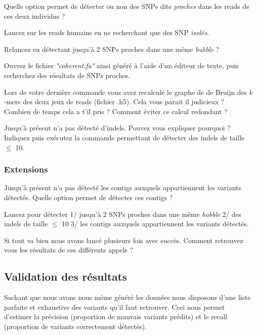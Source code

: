 \qu Quelle option permet  de détecter ou non des SNPs dits \emph{proches} dans les reads de ces deux individus ? 

\qu {} Lancez \discopp sur les reads humains en ne recherchant que des SNP \emph{isolés}.

\qu {} Relancez \discopp en détectant jusqu'à 2 SNPs proches dans une même \emph{bubble} ?

\qu Ouvrez le fichier \emph{"coherent.fa"} ainsi généré à l'aide d'un éditeur de texte, puis recherchez des résultats de SNPs proches.

\qu Lors de votre dernière commande vous avez recalculé le graphe de de Bruijn des $k$-mers des deux jeux de reads (fichier .h5). Cela vous parait il judicieux ? Combien de temps cela a t'il pris ? Comment éviter ce calcul redondant ? 


\qu {} Jusqu'à présent \discopp n'a pas détecté d'indels. Pouvez vous expliquer pourquoi ? Indiquez puis exécutez la commande permettant de détecter des indels de taille $\leq$ 10.


\subsubsection*{Extensions}
\qu Jusqu'à présent \discopp n'a pas détecté les contigs auxquels appartiennent les variants détectés. Quelle option permet de détecter ces contigs ? 

\qu Lancez \discopp pour détecter 1/ jusqu'à 2 SNPs proches dans une même \emph{bubble} 2/ des indels de taille $\leq$ 10 3/ les contigs auxquels appartiennent les variants détectés.

\qu Si tout va bien nous avons lancé plusieurs fois \discopp avec succès. Comment retrouvez vous les résultats de ces différents appels ? 

\subsection*{Validation des résultats}
Sachant que nous avons nous même généré les données nous disposons d'une liste parfaite et exhaustive des variants qu'il faut retrouver. Ceci nous permet d'estimer la précision (proportion de mauvais variants prédits) et le recall (proportion de variants correctement détectés).

